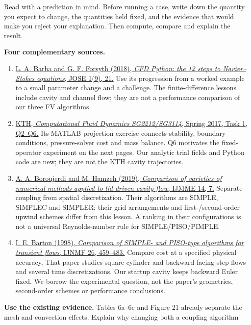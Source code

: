 Read with a prediction in mind. Before running a case, write down the quantity
you expect to change, the quantities held fixed, and the evidence that would
make you reject your explanation. Then compute, compare and explain the result.

\textbf{Four complementary sources.}
\begin{enumerate}
\item \href{https://jose.theoj.org/papers/10.21105/jose.00021}{L. A. Barba and G. F. Forsyth (2018), \emph{CFD Python: the 12 steps to Navier--Stokes equations}, JOSE 1(9), 21.}
Use its progression from a worked example to a small parameter change and a
challenge. The finite-difference lessons include cavity and channel flow;
they are not a performance comparison of our three FV algorithms.
\item \href{https://www.kth.se/social/files/58ad81f0f276542156c566ab/project.pdf}{KTH, \emph{Computational Fluid Dynamics SG2212/SG3114}, Spring 2017, Task 1, Q2--Q6.}
Its MATLAB projection exercise connects stability, boundary conditions,
pressure-solver cost and mass balance. Q6 motivates the fixed-operator
experiment on the next pages. Our analytic trial fields and Python code are
new; they are not the KTH cavity trajectories.
\item \href{https://doi.org/10.1186/s40712-019-0104-7}{A. A. Boroujerdi and M. Hamzeh (2019), \emph{Comparison of varieties of numerical methods applied to lid-driven cavity flow}, IJMME 14, 7.}
Separate coupling from spatial discretization. Their algorithms are SIMPLE,
SIMPLEC and SIMPLER; their grid arrangements and first-/second-order upwind
schemes differ from this lesson. A ranking in their configurations is not a
universal Reynolds-number rule for SIMPLE/PISO/PIMPLE.
\item \href{https://doi.org/10.1002/(SICI)1097-0363(19980228)26:4<459::AID-FLD645>3.0.CO;2-U}{I. E. Barton (1998), \emph{Comparison of SIMPLE- and PISO-type algorithms for transient flows}, IJNMF 26, 459--483.}
Compare cost at a specified physical accuracy. That paper studies square-cylinder
and backward-facing-step flows and several time discretizations. Our startup
cavity keeps backward Euler fixed. We borrow the experimental question, not
the paper's geometries, second-order schemes or performance conclusions.
\end{enumerate}
\textbf{Use the existing evidence.} Tables 6a--6c and Figure 21 already separate
the mesh and convection effects. Explain why changing both a coupling algorithm
